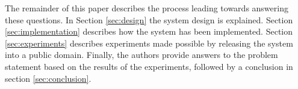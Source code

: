 The remainder of this paper describes the process leading towards answering these questions. In Section \ref{sec:design} the system design is explained. Section \ref{sec:implementation} describes how the system has been implemented. Section \ref{sec:experiments} describes experiments made possible by releasing the system into a public domain. Finally, the authors provide answers to the problem statement based on the results of the experiments, followed by a conclusion in section \ref{sec:conclusion}.

